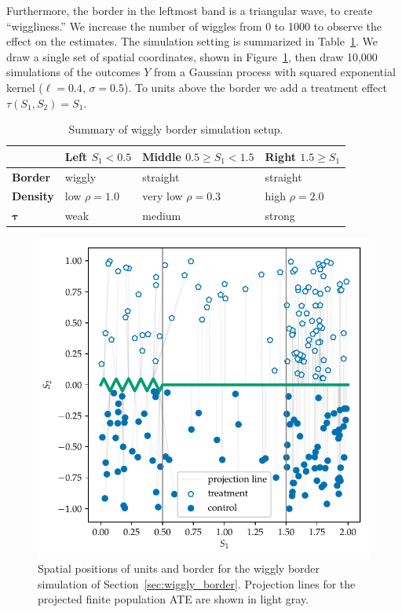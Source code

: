 \documentclass[letter]{article}
\makeatletter
\def\maxwidth{\ifdim\Gin@nat@width>\linewidth\linewidth
\else\Gin@nat@width\fi}
\let\Oldincludegraphics\includegraphics
\renewcommand{\includegraphics}[1]{\Oldincludegraphics[width=0.9\maxwidth]{#1}}
\newcommand{\taubold}{\bm{\tau}}
\makeatother
\begin{document}
Furthermore, the border in the leftmost band is a triangular wave, to create ``wiggliness.''
We increase the number of wiggles from 0 to 1000 to observe the effect on the estimates.
The simulation setting is summarized in Table~\ref{table:wiggly_setup}.
We draw a single set of spatial coordinates, shown in Figure~\ref{fig:wiggly_boundaries_setup}, then draw 10,000 simulations of the outcomes \(Y\) from a Gaussian process with squared exponential kernel (\(\ell=0.4\), \(\sigma=0.5\)).
To units above the border we add a treatment effect \(\tau(S_1, S_2) = S_1\).
    


\begin{table}[tbp]
\centering
\begin{tabular}{llll}
\hline
& Left \(S_1< 0.5\) & Middle \(0.5 \ge S_1 < 1.5\) & Right \(1.5 \ge S_1\)\tabularnewline
\hline
\textbf{Border} & wiggly & straight & straight\tabularnewline
\textbf{Density} & low \(\rho=1.0\) & very low \(\rho=0.3\) & high \(\rho=2.0\)\tabularnewline
\(\taubold\) & weak & medium & strong\tabularnewline
\hline
\end{tabular}
\caption{Summary of wiggly border simulation setup. \label{table:wiggly_setup}}
\end{table}


    	\begin{figure}
\centering
\includegraphics{../figures/wiggly_boundaries_setup.pdf}
\caption{\label{fig:wiggly_boundaries_setup}Spatial positions of units and border for the wiggly border simulation of Section~\ref{sec:wiggly_border}. Projection lines for the projected finite population ATE are shown in light gray.}
\end{figure}
    
\end{document}
